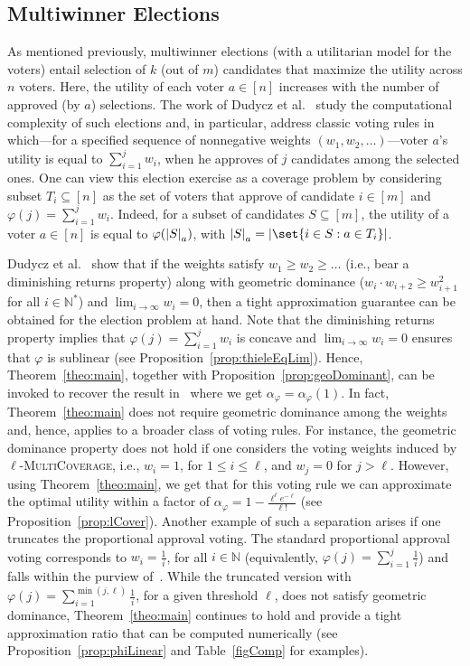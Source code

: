 \subsection{Multiwinner Elections}
\label{subsection:multiwinner-election} 
As mentioned previously, multiwinner elections (with a utilitarian model for the voters) entail selection of $k$ (out of $m$) candidates that maximize the utility across $n$ voters. Here, the utility of each voter $a \in [n]$ increases with the number of approved (by $a$) selections. 
The work of Dudycz et al.~\cite{DMMS20} study the computational complexity of such elections and, in particular, address classic voting rules in which---for a specified sequence of nonnegative weights $(w_1, w_2, \ldots)$---voter $a$'s utility is equal to $\sum_{i=1}^j w_i$, when he approves of $j$ candidates among the selected ones. One can view this election exercise as a coverage problem by considering subset $T_i \subseteq [n]$ as the set of voters that approve of candidate $i \in [m]$ and $\varphi(j) = \sum_{i=1}^j w_i$. Indeed, for a subset of candidates $S \subseteq [m]$, the utility of a voter $a \in [n]$ is equal to $\varphi ( \abs{S}_a)$, with $\abs{S}_a = \abs{\set{i \in S : a \in T_i}}$. 

Dudycz et al.~\cite{DMMS20} show that if the weights satisfy $w_1 \geq w_2 \geq \ldots$ (i.e., bear a  diminishing returns property) along with geometric dominance ($w_{i } \cdot w_{i+2} \geq w_{i+1}^2$ for all $i \in \mathbb{N}^*$) and $\lim_{i \rightarrow \infty} w_i = 0$, then a tight approximation guarantee can be obtained for the election problem at hand. Note that the diminishing returns property implies that $\varphi(j) = \sum_{i=1}^j w_i$ is concave and $\lim_{i \rightarrow \infty} w_i = 0$ ensures that $\varphi$ is sublinear (see Proposition~\ref{prop:thieleEqLim}). Hence, Theorem~\ref{theo:main}, together with Proposition~\ref{prop:geoDominant}, can be invoked to recover the result in~\cite{DMMS20} where we get $\alpha_{\varphi} = \alpha_{\varphi}(1)$. In fact, Theorem~\ref{theo:main} does not require geometric dominance among the weights and, hence, applies to a broader class of voting rules. For instance, the geometric dominance property does not hold if one considers the voting weights induced by $\ell$-\textsc{MultiCoverage}, i.e., $w_i = 1$, for $1 \leq i \leq \ell$, and $w_j = 0$ for $j > \ell$.  However, using Theorem~\ref{theo:main}, we get that for this voting rule we can approximate the optimal utility within a factor of $\alpha_\varphi = 1-\frac{\ell^{\ell}e^{-\ell}}{\ell!}$ (see Proposition~\ref{prop:lCover}). Another example of such a separation arises if one truncates the proportional approval voting. The standard proportional approval voting corresponds to $w_i = \frac{1}{i}$, for all $i \in \mathbb{N}$ (equivalently,  $\varphi(j) = \sum_{i=1}^j \frac{1}{i}$) and falls within the purview of~\cite{DMMS20}. While the truncated version with $\varphi(j) = \sum_{i=1}^{\min(j, \ell)} \frac{1}{i}$, for a given threshold $\ell$, does not satisfy geometric dominance, Theorem~\ref{theo:main} continues to hold and provide a tight approximation ratio that can be computed numerically (see Proposition~\ref{prop:phiLinear} and Table~\ref{figComp} for examples).

